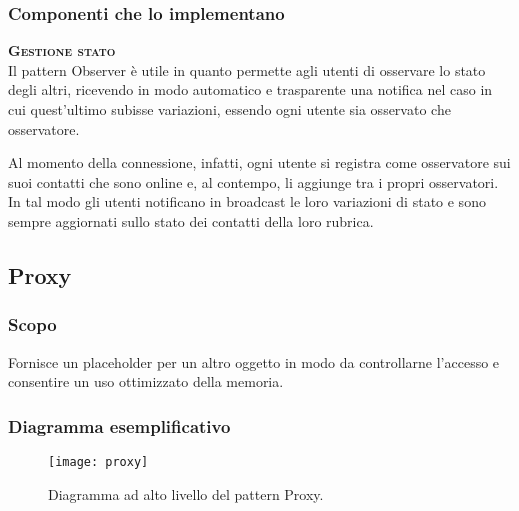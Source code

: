 \subsubsection{Componenti che lo implementano}
\begin{description}
  \item{\scshape\bfseries Gestione stato}\\
Il pattern Observer è utile in quanto permette agli utenti di osservare lo stato degli altri, ricevendo in modo automatico e trasparente una notifica nel caso in cui quest'ultimo subisse variazioni, essendo ogni utente sia osservato che osservatore.

Al momento della connessione, infatti, ogni utente si registra come osservatore sui suoi contatti che sono online e, al contempo, li aggiunge tra i propri osservatori. In tal modo gli utenti notificano in broadcast le loro variazioni di stato e sono sempre aggiornati sullo stato dei contatti della loro rubrica.
\end{description}

\subsection{Proxy}

\subsubsection{Scopo}
Fornisce un placeholder per un altro oggetto in modo da controllarne l'accesso e consentire un uso ottimizzato della memoria.

\subsubsection{Diagramma esemplificativo}
\begin{figure}
\centering
\texttt{[image: proxy]}
\caption{Diagramma ad alto livello del pattern Proxy.}\label{fig:proxy}
\end{figure}

